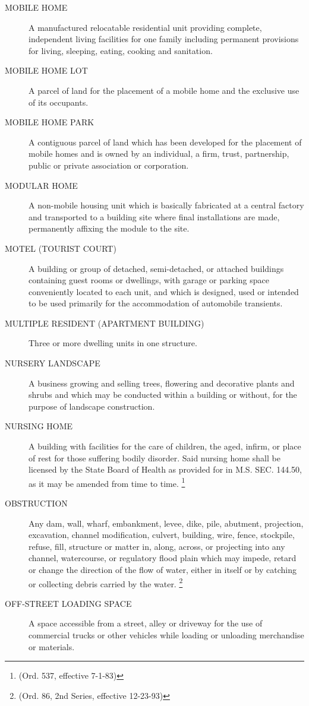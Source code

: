 \begin{description}
    \item[MOBILE HOME] A manufactured relocatable residential unit providing complete, independent living facilities for one family including permanent provisions for living, sleeping, eating, cooking and sanitation.
    \item[MOBILE HOME LOT] A parcel of land for the placement of a mobile home and the exclusive use of its occupants.
    \item[MOBILE HOME PARK] A contiguous parcel of land which has been developed for the placement of mobile homes and is owned by an individual, a firm, trust, partnership, public or private association or corporation.
    \item[MODULAR HOME] A non-mobile housing unit which is basically fabricated at a central factory and transported to a building site where final installations are made, permanently affixing the module to the site.
    \item[MOTEL (TOURIST COURT)] A building or group of detached, semi-detached, or attached buildings containing guest rooms or dwellings, with garage or parking space conveniently located to each unit, and which is designed, used or intended to be used primarily for the accommodation of automobile transients.
    \item[MULTIPLE RESIDENT (APARTMENT BUILDING)] Three or more dwelling units in one structure.
    \item[NURSERY LANDSCAPE] A business growing and selling trees, flowering and decorative plants and shrubs and which may be conducted within a building or without, for the purpose of landscape construction.
    \item[NURSING HOME] A building with facilities for the care of children, the aged, infirm, or place of rest for those suffering bodily disorder. Said nursing home shall be licensed by the State Board of Health as provided for in M.S. SEC. 144.50, as it may be amended from time to time. \footnote{(Ord. 537, effective 7-1-83)}
    \item[OBSTRUCTION] Any dam, wall, wharf, embankment, levee, dike, pile, abutment, projection, excavation, channel modification, culvert, building, wire, fence, stockpile, refuse, fill, structure or matter in, along, across, or projecting into any channel, watercourse, or regulatory flood plain which may impede, retard or change the direction of the flow of water, either in itself or by catching or collecting debris carried by the water. \footnote{(Ord. 86, 2nd Series, effective 12-23-93)}
    \item[OFF-STREET LOADING SPACE] A space accessible from a street, alley or driveway for the use of commercial trucks or other vehicles while loading or unloading merchandise or materials.

\end{description}

